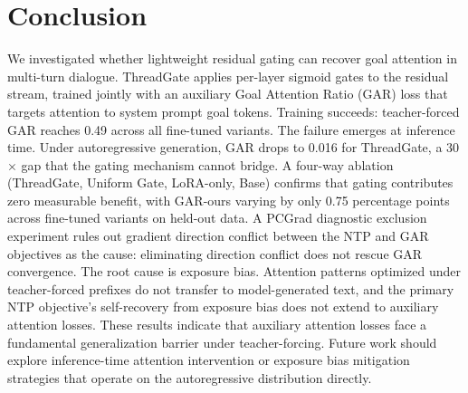 \section{Conclusion}\label{sec:conclusion}

We investigated whether lightweight residual gating can recover goal attention in multi-turn dialogue. ThreadGate applies per-layer sigmoid gates to the residual stream, trained jointly with an auxiliary Goal Attention Ratio (GAR) loss that targets attention to system prompt goal tokens. Training succeeds: teacher-forced GAR reaches 0.49 across all fine-tuned variants. The failure emerges at inference time. Under autoregressive generation, GAR drops to 0.016 for ThreadGate, a 30$\times$ gap that the gating mechanism cannot bridge. A four-way ablation (ThreadGate, Uniform Gate, LoRA-only, Base) confirms that gating contributes zero measurable benefit, with GAR-ours varying by only 0.75 percentage points across fine-tuned variants on held-out data. A PCGrad diagnostic exclusion experiment rules out gradient direction conflict between the NTP and GAR objectives as the cause: eliminating direction conflict does not rescue GAR convergence. The root cause is exposure bias. Attention patterns optimized under teacher-forced prefixes do not transfer to model-generated text, and the primary NTP objective's self-recovery from exposure bias does not extend to auxiliary attention losses. These results indicate that auxiliary attention losses face a fundamental generalization barrier under teacher-forcing. Future work should explore inference-time attention intervention or exposure bias mitigation strategies that operate on the autoregressive distribution directly.
